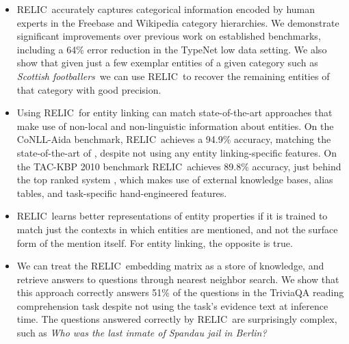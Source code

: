 \documentclass{article} \usepackage{iclr2020_conference,times}
\newcommand{\ack}{RELIC\xspace}
\begin{document}
\begin{itemize}
    \item \ack~accurately captures categorical information encoded by human experts in the Freebase and Wikipedia category hierarchies. We demonstrate significant improvements over previous work on established benchmarks, including a 64\% error reduction in the TypeNet low data setting. We also show that given just a few exemplar entities of a given category such as {\it Scottish footballers}~we can use \ack~to recover the remaining entities of that category with good precision.
    \item Using \ack~for entity linking can match state-of-the-art approaches that make use of non-local and non-linguistic information about entities. On the CoNLL-Aida benchmark, \ack~achieves a 94.9\% accuracy, matching the state-of-the-art of \cite{Raiman2018-hm}, despite not using any entity linking-specific features. On the TAC-KBP 2010 benchmark \ack~achieves 89.8\% accuracy, just behind the top ranked system \citep{Raiman2018-hm}, which makes use of external knowledge bases, alias tables, and task-specific hand-engineered features.
    \item \ack~learns better representations of entity properties if it is trained to match just the contexts in which entities are mentioned, and not the surface form of the mention itself. For entity linking, the opposite is true.
    \item We can treat the \ack~embedding matrix as a store of knowledge, and retrieve answers to questions through nearest neighbor search. We show that this approach correctly answers 51\% of the questions in the TriviaQA reading comprehension task \citep{joshi2017triviaqa} despite not using the task's evidence text at inference time. The questions answered correctly by \ack~are surprisingly complex, such as \emph{Who was the last inmate of Spandau jail in Berlin?}

\end{itemize}
\end{document}
